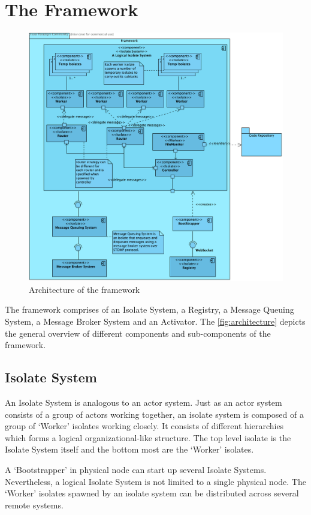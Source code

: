 \section{The Framework}
\begin{figure}[H]
  \centering
  \includegraphics[width=1\textwidth]{figures/componentDiagram}
  \caption[architecture]{Architecture of the framework}
  \label{fig:architecture}
\end{figure}


The framework comprises of an Isolate System, a Registry, a Message Queuing System, a Message Broker System and an Activator. The \autoref{fig:architecture} depicts the general overview of different components and sub-components of the framework.

  \subsection{Isolate System}
  An Isolate System is analogous to an actor system. Just as an actor system consists of a group of actors working together, an isolate system is composed of a group of ‘Worker’ isolates working closely. It consists of different hierarchies which forms a logical organizational-like structure. The top level isolate is the Isolate System itself and the bottom most are the ‘Worker’ isolates.

  A ‘Bootstrapper’ in physical node can start up several Isolate Systems. Nevertheless, a logical Isolate System is not limited to a single physical node. The ‘Worker’ isolates spawned by an isolate system can be distributed across several remote systems.

